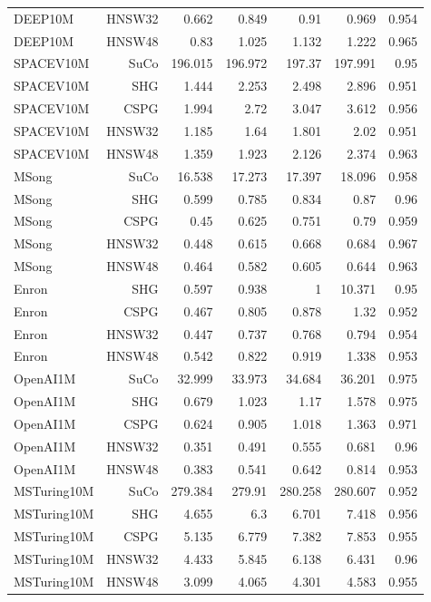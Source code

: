 \begin{table}[t]
\begin{tabular}{lrrrrrr}
DEEP10M & HNSW32 & 0.662 & 0.849 & 0.91 & 0.969 & 0.954 \\
DEEP10M & HNSW48 & 0.83 & 1.025 & 1.132 & 1.222 & 0.965 \\
SPACEV10M & SuCo & 196.015 & 196.972 & 197.37 & 197.991 & 0.95 \\
SPACEV10M & SHG & 1.444 & 2.253 & 2.498 & 2.896 & 0.951 \\
SPACEV10M & CSPG & 1.994 & 2.72 & 3.047 & 3.612 & 0.956 \\
SPACEV10M & HNSW32 & 1.185 & 1.64 & 1.801 & 2.02 & 0.951 \\
SPACEV10M & HNSW48 & 1.359 & 1.923 & 2.126 & 2.374 & 0.963 \\
MSong & SuCo & 16.538 & 17.273 & 17.397 & 18.096 & 0.958 \\
MSong & SHG & 0.599 & 0.785 & 0.834 & 0.87 & 0.96 \\
MSong & CSPG & 0.45 & 0.625 & 0.751 & 0.79 & 0.959 \\
MSong & HNSW32 & 0.448 & 0.615 & 0.668 & 0.684 & 0.967 \\
MSong & HNSW48 & 0.464 & 0.582 & 0.605 & 0.644 & 0.963 \\
Enron & SHG & 0.597 & 0.938 & 1 & 10.371 & 0.95 \\
Enron & CSPG & 0.467 & 0.805 & 0.878 & 1.32 & 0.952 \\
Enron & HNSW32 & 0.447 & 0.737 & 0.768 & 0.794 & 0.954 \\
Enron & HNSW48 & 0.542 & 0.822 & 0.919 & 1.338 & 0.953 \\
OpenAI1M & SuCo & 32.999 & 33.973 & 34.684 & 36.201 & 0.975 \\
OpenAI1M & SHG & 0.679 & 1.023 & 1.17 & 1.578 & 0.975 \\
OpenAI1M & CSPG & 0.624 & 0.905 & 1.018 & 1.363 & 0.971 \\
OpenAI1M & HNSW32 & 0.351 & 0.491 & 0.555 & 0.681 & 0.96 \\
OpenAI1M & HNSW48 & 0.383 & 0.541 & 0.642 & 0.814 & 0.953 \\
MSTuring10M & SuCo & 279.384 & 279.91 & 280.258 & 280.607 & 0.952 \\
MSTuring10M & SHG & 4.655 & 6.3 & 6.701 & 7.418 & 0.956 \\
MSTuring10M & CSPG & 5.135 & 6.779 & 7.382 & 7.853 & 0.955 \\
MSTuring10M & HNSW32 & 4.433 & 5.845 & 6.138 & 6.431 & 0.96 \\
MSTuring10M & HNSW48 & 3.099 & 4.065 & 4.301 & 4.583 & 0.955 \\
\bottomrule
\end{tabular}
\end{table}
